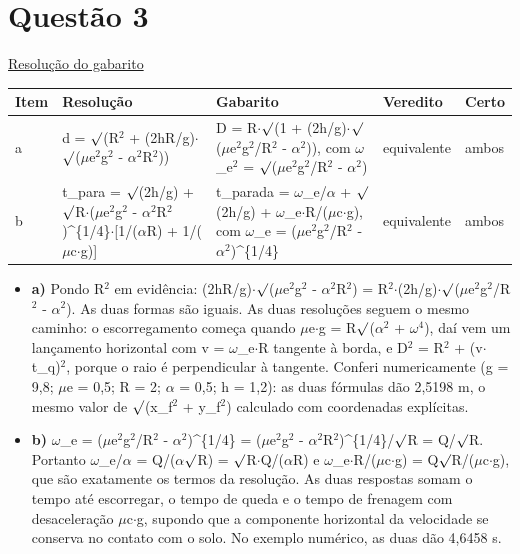 \documentclass{article}%
\begin{document}
\section*{Questão 3}%
\href{https://poliedroresolve.sistemapoliedro.com.br/vestibulares/ita/2027/ita-2-fase-dia-3-22-10-2026-2-fase-dia-3/dissertativa-3-fisica-2-fase-dia-3-ita-2027}{Resolução do gabarito}\par\smallskip%
\begin{longtable}{@{}p{} p{} p{} p{} p{}@{}}\toprule Item & Resolução & Gabarito & Veredito & Certo \\ \midrule
a & d = $\surd$(R$^2$ + (2hR/g)$\cdot$$\surd$($\mu$e$^2$g$^2$ - $\alpha$$^2$R$^2$)) & D = R$\cdot$$\surd$(1 + (2h/g)$\cdot$$\surd$($\mu$e$^2$g$^2$/R$^2$ - $\alpha$$^2$)), com $\omega$\_e$^2$ = $\surd$($\mu$e$^2$g$^2$/R$^2$ - $\alpha$$^2$) & equivalente & ambos \\
b & t\_para = $\surd$(2h/g) + $\surd$R$\cdot$($\mu$e$^2$g$^2$ - $\alpha$$^2$R$^2$)\^{}\{1/4\}$\cdot${[}1/($\alpha$R) + 1/($\mu$c$\cdot$g){]} & t\_parada = $\omega$\_e/$\alpha$ + $\surd$(2h/g) + $\omega$\_e$\cdot$R/($\mu$c$\cdot$g), com $\omega$\_e = ($\mu$e$^2$g$^2$/R$^2$ - $\alpha$$^2$)\^{}\{1/4\} & equivalente & ambos \\
\bottomrule\end{longtable}%
\begin{itemize}%
\item%
\textbf{a)} Pondo R$^2$ em evidência: (2hR/g)$\cdot$$\surd$($\mu$e$^2$g$^2$ - $\alpha$$^2$R$^2$) = R$^2$$\cdot$(2h/g)$\cdot$$\surd$($\mu$e$^2$g$^2$/R$^2$ - $\alpha$$^2$). As duas formas são iguais. As duas resoluções seguem o mesmo caminho: o escorregamento começa quando $\mu$e$\cdot$g = R$\surd$($\alpha$$^2$ + $\omega$$^{4}$), daí vem um lançamento horizontal com v = $\omega$\_e$\cdot$R tangente à borda, e D$^2$ = R$^2$ + (v$\cdot$t\_q)$^2$, porque o raio é perpendicular à tangente. Conferi numericamente (g = 9,8; $\mu$e = 0,5; R = 2; $\alpha$ = 0,5; h = 1,2): as duas fórmulas dão 2,5198 m, o mesmo valor de $\surd$(x\_f$^2$ + y\_f$^2$) calculado com coordenadas explícitas.%
\item%
\textbf{b)} $\omega$\_e = ($\mu$e$^2$g$^2$/R$^2$ - $\alpha$$^2$)\^{}\{1/4\} = ($\mu$e$^2$g$^2$ - $\alpha$$^2$R$^2$)\^{}\{1/4\}/$\surd$R = Q/$\surd$R. Portanto $\omega$\_e/$\alpha$ = Q/($\alpha$$\surd$R) = $\surd$R$\cdot$Q/($\alpha$R) e $\omega$\_e$\cdot$R/($\mu$c$\cdot$g) = Q$\surd$R/($\mu$c$\cdot$g), que são exatamente os termos da resolução. As duas respostas somam o tempo até escorregar, o tempo de queda e o tempo de frenagem com desaceleração $\mu$c$\cdot$g, supondo que a componente horizontal da velocidade se conserva no contato com o solo. No exemplo numérico, as duas dão 4,6458 s.%
\end{itemize}%
\end{document}

